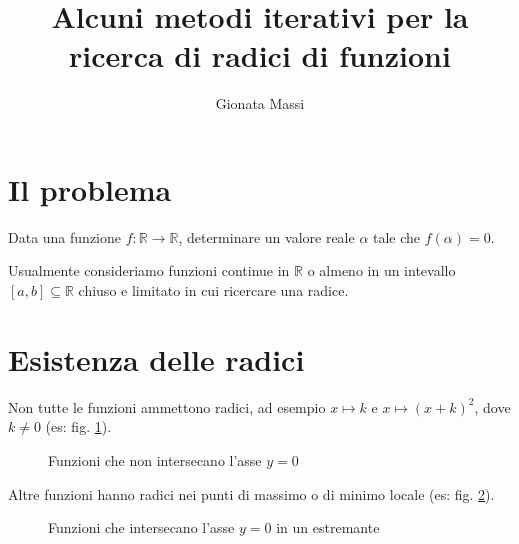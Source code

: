 \documentclass[10pt]{article}
\title{Alcuni metodi iterativi per la ricerca di radici di funzioni}
\author{Gionata Massi}
\date{} %
\begin{document}
\maketitle

\thispagestyle{empty}%

\section{Il problema}

Data una funzione $f : \mathbb{R} \to \mathbb{R}$, determinare un valore reale $\alpha$ tale che $f(\alpha) = 0$.

Usualmente consideriamo funzioni continue in $\mathbb{R}$ o almeno in un intevallo $[a, b] \subseteq \mathbb{R}$ chiuso e limitato in cui ricercare una radice.

\section{Esistenza delle radici}

Non tutte le funzioni ammettono radici, ad esempio $x \mapsto k$ e $x \mapsto (x + k)^2$, dove $k \neq 0$ (es: fig. \ref{fig:nozeri}).

\begin{figure}[ht]
\centering
{}
\caption{Funzioni che non intersecano l'asse $y = 0$}
\label{fig:nozeri}
\end{figure}

Altre funzioni hanno radici nei punti di massimo o di minimo locale (es: fig. \ref{fig:zero_estremante}).

\begin{figure}[ht]
    \centering
    \caption{Funzioni che intersecano l'asse $y = 0$ in un estremante}
    \label{fig:zero_estremante}
    \end{figure}
    
\end{document}
